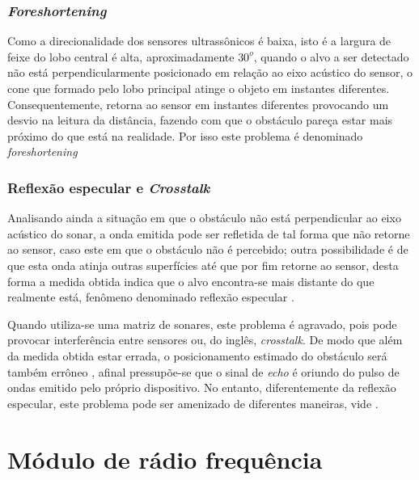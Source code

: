 \subsubsection{\textit{Foreshortening}}
Como a direcionalidade dos sensores ultrassônicos é baixa, isto é a largura de feixe do lobo central é alta, aproximadamente $30^o$, quando o alvo 
a ser detectado não está perpendicularmente posicionado em relação ao eixo acústico do sensor, o cone que formado pelo lobo principal atinge o objeto 
em instantes diferentes. Consequentemente, retorna ao sensor em instantes diferentes provocando um desvio na leitura da distância, fazendo com que o 
obstáculo pareça estar mais próximo do que está na realidade. Por isso este problema é denominado \textit{foreshortening}

\subsubsection{Reflexão especular e \textit{Crosstalk}}
Analisando ainda a situação em que o obstáculo não está perpendicular ao eixo acústico do sonar, a onda emitida pode ser refletida de tal 
forma que não retorne ao sensor, caso este em que o obstáculo não é percebido; outra possibilidade é de que esta onda atinja outras superfícies até 
que por fim retorne ao sensor, desta forma a medida obtida indica que o alvo encontra-se mais distante do que realmente está, fenômeno denominado 
reflexão especular \cite{roseli,siegwart,everett}.  

Quando utiliza-se uma matriz de sonares, este problema é agravado, pois pode provocar interferência entre sensores ou, do inglês, \textit{crosstalk}.
De modo que além da medida obtida estar errada, o posicionamento estimado do obstáculo será também errôneo \cite{murphy}, afinal pressupõe-se que o 
sinal de \textit{echo} é oriundo do pulso de ondas emitido pelo próprio dispositivo.
No entanto, diferentemente da reflexão especular, este problema pode ser amenizado de diferentes maneiras, vide 
.

\section{Módulo de rádio frequência}

